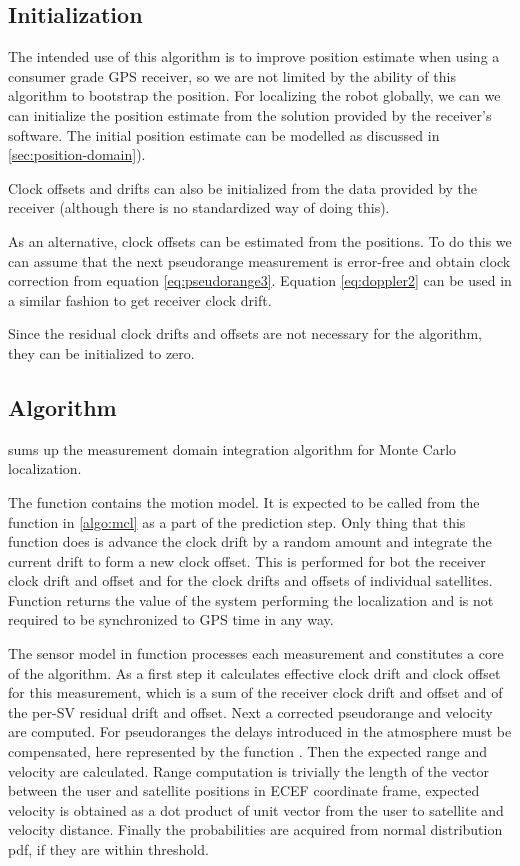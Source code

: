 \subsection{Initialization}
The intended use of this algorithm is to improve position estimate when using
a consumer grade GPS receiver, so we are not limited by the ability of this
algorithm to bootstrap the position.
For localizing the robot globally, we can we can initialize the position
estimate from the solution provided by the receiver's software.
The initial position estimate can be modelled as discussed in \cref{sec:position-domain}).

Clock offsets and drifts can also be initialized from the data provided by the
receiver (although there is no standardized way of doing this).

As an alternative, clock offsets can be estimated from the positions.
To do this we can assume that the next pseudorange measurement is error-free
and obtain clock correction from equation \eqref{eq:pseudorange3}.
Equation \eqref{eq:doppler2} can be used in a similar fashion to get receiver clock drift.

Since the residual clock drifts and offsets are not necessary for the algorithm,
they can be initialized to zero.

\subsection{Algorithm}
 sums up the measurement domain integration
algorithm for Monte Carlo localization.

The function \predictGPS{} contains the motion model.
It is expected to be called from the function \sampleFromActionModel{} in \cref{algo:mcl}
as a part of the prediction step.
Only thing that this function does is advance the clock drift by a random amount
and integrate the current drift to form a new clock offset.
This is performed for bot the receiver clock drift and offset and for the
clock drifts and offsets of individual satellites.
Function \timeFunc{} returns the value of the system performing the localization
and is not required to be synchronized to GPS time in any way.

The sensor model in function \observationProbabilityGPS{} processes each measurement
and constitutes a core of the algorithm.
As a first step it calculates effective clock drift and clock offset for this
measurement, which is a sum of the receiver clock drift and offset and of the 
per-SV residual drift and offset.
Next a corrected pseudorange and velocity are computed.
For pseudoranges the delays introduced in the atmosphere must be compensated,
here represented by the function \delays{}.
Then the expected range and velocity are calculated.
Range computation is trivially the length of the vector between the user and 
satellite positions in ECEF coordinate frame, expected velocity is obtained
as a dot product of unit vector from the user to satellite and velocity distance.
Finally the probabilities are acquired from normal distribution pdf, if they
are within threshold.

